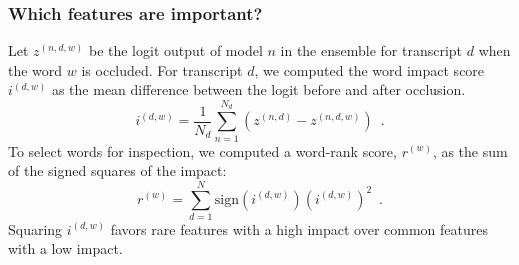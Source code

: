 \begin{frame}
    \frametitle{Which features are important?}
    Let $z^{(n, d, w)}$ be the logit output of model $n$ in the ensemble for transcript $d$ when the word $w$ is occluded. For transcript $d$, we computed the word impact score $i^{(d, w)}$ as the mean difference between the logit before and after occlusion.
    \begin{equation}
        i^{(d,w)} = \frac{1}{N_d} \sum_{n=1}^{N_d} \left( z^{(n, d)} - z^{(n, d, w)} \right) \enspace .
    \end{equation}
    To select words for inspection, we computed a word-rank score, $r^{(w)}$, as the sum of the signed squares of the impact:
    \begin{equation}
        r^{(w)} = \sum_{d=1}^{N} \text{sign}\left( i^{(d, w)} \right) \left( i^{(d,w)}\right) ^2 \enspace .
    \end{equation}
    Squaring $i^{(d,w)}$ favors rare features with a high impact over common features with a low impact.
\end{frame}


\newcommand{\symptom}[2]{{\color<#1>{dtured}#2}}
\newcommand{\urgency}[2]{{\color<#1>{RoyalBlue}#2}}
\newcommand{\recognition}[2]{{\color<#1>{OliveGreen}#2}}

